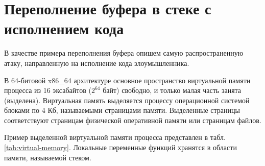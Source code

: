 \section[Переполнение буфера в стеке с исполнением кода]{Переполнение буфера в стеке с \protect\\ исполнением кода}

В качестве примера переполнения буфера опишем самую распространенную атаку, направленную на исполнение кода злоумышленника.

В 64-битовой x86\_64 архитектуре основное пространство виртуальной памяти процесса из 16 эксабайтов ($2^{64}$ байт) свободно, и только малая часть занята (выделена). Виртуальная память выделяется процессу операционной системой блоками по 4 Кб, называемыми страницами памяти. Выделенные страницы соответствуют страницам физической оперативной памяти или страницам файлов.

Пример выделенной виртуальной памяти процесса представлен в табл. \ref{tab:virtual-memory}. Локальные переменные функций хранятся в области памяти, называемой стеком.
\begin{table}[!ht]
    \centering
    \caption{Пример структуры виртуальной памяти процесса\label{tab:virtual-memory}}
\end{table}

